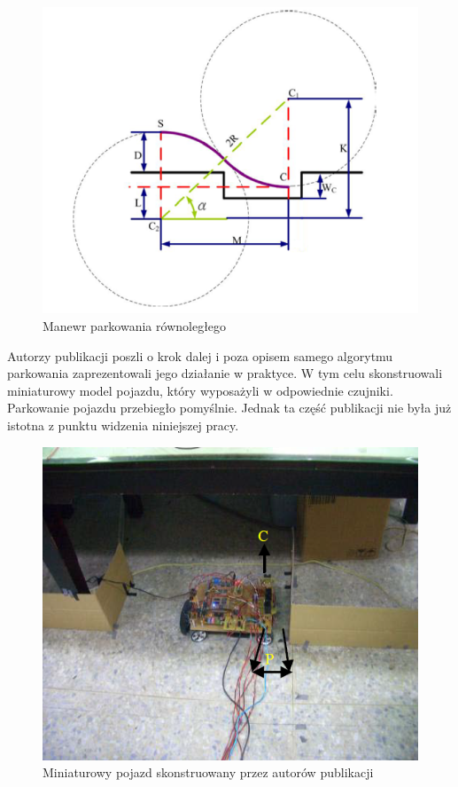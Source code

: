 \documentclass[a4paper,11pt,twoside]{report}
\theoremstyle{definition}
\begin{document}
\begin{figure}[h!]
\centering
\includegraphics[scale=0.40]{parallelParking}
\caption[Manewr parkowania równoległego]{Manewr parkowania równoległego}
\end{figure} 
 
Autorzy publikacji poszli o krok dalej i poza opisem samego algorytmu parkowania zaprezentowali jego działanie w praktyce. W tym celu skonstruowali miniaturowy model pojazdu, który wyposażyli w odpowiednie czujniki. Parkowanie pojazdu przebiegło pomyślnie. Jednak ta część publikacji nie była już istotna z punktu widzenia niniejszej pracy.
 
\begin{figure}[h!]
\centering
\includegraphics[scale=0.7]{miniVehicle}
\caption[Miniaturowy pojazd skonstruowany przez autorów publikacji]{Miniaturowy pojazd skonstruowany przez autorów publikacji}
\end{figure}
\end{document}
